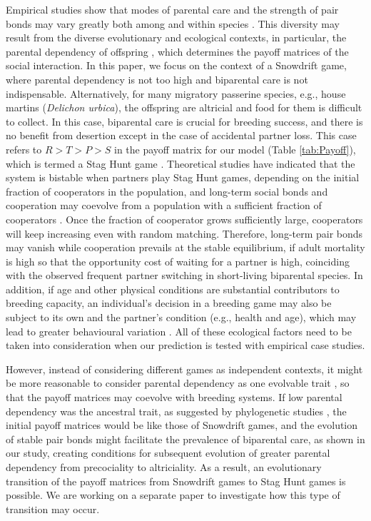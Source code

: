 \documentclass[12pt]{article}
\begin{document}
Empirical studies show that modes of parental care and the strength of pair bonds may vary greatly both among and within species \citep{Emlen.Oring1977, Clutton-Brock1991}. This diversity may result from the diverse evolutionary and ecological contexts, in particular, the parental dependency of offspring \citep{Thomas.etal2006}, which determines the payoff matrices of the social interaction. In this paper, we focus on the context of a Snowdrift game, where parental dependency is not too high and biparental care is not indispensable. Alternatively, for many migratory passerine species, e.g., house martins (\textit{Delichon urbica}), the offspring are altricial and food for them is difficult to collect. In this case, biparental care is crucial for breeding success, and there is no benefit from desertion except in the case of accidental partner loss. This case refers to $R>T>P>S$ in the payoff matrix for our model (Table \ref{tab:Payoff}), which is termed a Stag Hunt game \citep{Santos.etal2006a}. Theoretical studies have indicated that the system is bistable when partners play Stag Hunt games, depending on the initial fraction of cooperators in the population, and long-term social bonds and cooperation may coevolve from a population with a sufficient fraction of cooperators \citep{Skyrms.Pemantle2000, Skyrms2004}. Once the fraction of cooperator grows sufficiently large, cooperators will keep increasing even with random matching. Therefore, long-term pair bonds may vanish while cooperation prevails at the stable equilibrium, if adult mortality is high so that the opportunity cost of waiting for a partner is high, coinciding with the observed frequent partner switching in short-living biparental species. In addition, if age and other physical conditions are substantial contributors to breeding capacity, an individual's decision in a breeding game may also be subject to its own and the partner's condition (e.g., health and age), which may lead to greater behavioural variation \citep{McNamara.etal1999, Dijk.etal2011}. All of these ecological factors need to be taken into consideration when our prediction is tested with empirical case studies. 

However, instead of considering different games as independent contexts, it might be more reasonable to consider parental dependency as one evolvable trait \citep{Thomas.etal2006, Gardner.Smiseth2011}, so that the payoff matrices may coevolve with breeding systems. If low parental dependency was the ancestral trait, as suggested by phylogenetic studies \citep{Ligon1999, Bennett.Owens2002}, the initial payoff matrices would be like those of Snowdrift games, and the evolution of stable pair bonds might facilitate the prevalence of biparental care, as shown in our study, creating conditions for subsequent evolution of greater parental dependency from precociality to altriciality. As a result, an evolutionary transition of the payoff matrices from Snowdrift games to Stag Hunt games is possible. We are working on a separate paper to investigate how this type of transition may occur.
\end{document}
